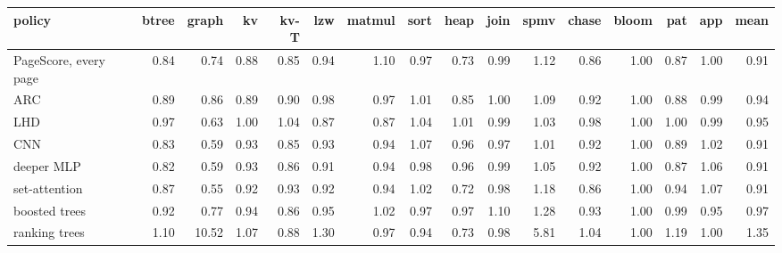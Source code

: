 \begin{tabular}{lrrrrrrrrrrrrrrr}
\toprule
policy & btree & graph & kv & kv-T & lzw & matmul & sort & heap & join & spmv & chase & bloom & pat & app & mean \\
\midrule
PageScore, every page & 0.84 & 0.74 & 0.88 & 0.85 & 0.94 & 1.10 & 0.97 & 0.73 & 0.99 & 1.12 & 0.86 & 1.00 & 0.87 & 1.00 & 0.91 \\
ARC & 0.89 & 0.86 & 0.89 & 0.90 & 0.98 & 0.97 & 1.01 & 0.85 & 1.00 & 1.09 & 0.92 & 1.00 & 0.88 & 0.99 & 0.94 \\
LHD & 0.97 & 0.63 & 1.00 & 1.04 & 0.87 & 0.87 & 1.04 & 1.01 & 0.99 & 1.03 & 0.98 & 1.00 & 1.00 & 0.99 & 0.95 \\
CNN & 0.83 & 0.59 & 0.93 & 0.85 & 0.93 & 0.94 & 1.07 & 0.96 & 0.97 & 1.01 & 0.92 & 1.00 & 0.89 & 1.02 & 0.91 \\
deeper MLP & 0.82 & 0.59 & 0.93 & 0.86 & 0.91 & 0.94 & 0.98 & 0.96 & 0.99 & 1.05 & 0.92 & 1.00 & 0.87 & 1.06 & 0.91 \\
set-attention & 0.87 & 0.55 & 0.92 & 0.93 & 0.92 & 0.94 & 1.02 & 0.72 & 0.98 & 1.18 & 0.86 & 1.00 & 0.94 & 1.07 & 0.91 \\
boosted trees & 0.92 & 0.77 & 0.94 & 0.86 & 0.95 & 1.02 & 0.97 & 0.97 & 1.10 & 1.28 & 0.93 & 1.00 & 0.99 & 0.95 & 0.97 \\
ranking trees & 1.10 & 10.52 & 1.07 & 0.88 & 1.30 & 0.97 & 0.94 & 0.73 & 0.98 & 5.81 & 1.04 & 1.00 & 1.19 & 1.00 & 1.35 \\
\bottomrule
\end{tabular}
